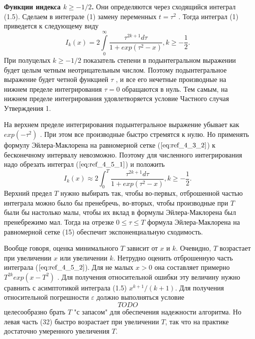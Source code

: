 \textbf{Функции индекса $k \geqslant -1/2$.} Они определяются через сходящийся
интеграл (1.5). Сделаем в интеграле (1) замену переменных $t=\tau^2$ . Тогда интеграл
(1) приведется к следующему виду
\begin{equation}
I_k(x)=2 \int\limits_0^{\infty} \frac{\tau^{2k+1}d\tau}{1+exp(\tau^2 - x)}, k \geqslant -\frac{1}{2}.
\label{eq:ref_4_5_1}
\end{equation}
При полуцелых $k \geqslant -1/2$ показатель степени в подынтегральном выражении
будет целым четным неотрицательным числом. Поэтому подынтегральное
выражение будет четной функцией $\tau$ , и все его нечетные производные на
нижнем пределе интегрирования $\tau = 0$ обращаются в нуль. Тем самым, на
нижнем пределе интегрирования удовлетворяется условие Частного случая
Утверждения 1.

На верхнем пределе интегрирования подынтегральное выражение убывает
как $exp(-\tau^2)$ . При этом все производные быстро стремятся к нулю. Но
применять формулу Эйлера-Маклорена на равномерной сетке ($\ref{eq:ref_4_3_2}$) к
бесконечному интервалу невозможно. Поэтому для численного интегрирования
надо обрезать интеграл ($\ref{eq:ref_4_5_1}$) и положить
\begin{equation}
I_k(x) \approx 2\int_0^{T} \frac{\tau^{2k+1}d\tau}{1+exp(\tau^2 - x)}, k \geqslant -\frac{1}{2}.
\label{eq:ref_4_5_2}
\end{equation}
Верхний предел $T$ нужно выбирать так, чтобы во-первых, отброшенной частью
интеграла можно было бы пренебречь, во-вторых, чтобы производные при $T$
были бы настолько малы, чтобы их вклад в формулы Эйлера-Маклорена был
пренебрежимо мал. Тогда на отрезке $0 \leqslant \tau \leqslant T$ формула Эйлера-Маклорена на
равномерной сетке (15) обеспечит экспоненциальную сходимость.

Вообще говоря, оценка минимального $T$ зависит от $x$ и $k$. Очевидно,
$T$ возрастает при увеличении $x$ или увеличении $k$. Нетрудно оценить
отброшенную часть интеграла ($\ref{eq:ref_4_5_2}$). Для не малых $x > 0$ она составляет
примерно  $T^{2k}exp(x-T^2)$ . Для получения относительной ошибки эту величину
нужно сравнить с асимптотикой интеграла (1.5) $x^{k+1}/(k+1)$. Для получения
относительной погрешности $\varepsilon$ должно выполняться условие
\begin{equation}
TODO
\label{eq:ref_4_5_3}
\end{equation}
целесообразно брать $T$ "с запасом" для обеспечения надежности алгоритма. Но
левая часть (32) быстро возрастает при увеличении $T$, так что на практике
достаточно умеренного увеличения $T$.

